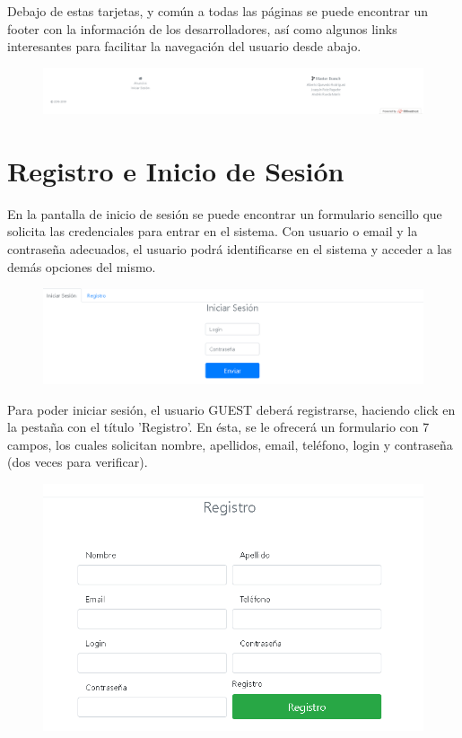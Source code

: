 Debajo de estas tarjetas, y com\'{u}n a todas las p\'{a}ginas se puede encontrar un footer con la informaci\'{o}n de los desarrolladores, as\'{i} como algunos links interesantes para facilitar la navegaci\'{o}n del usuario desde abajo.

\begin{figure}[h!]
\centering
\includegraphics[width=1\textwidth]{Img/ManualUsuario/FOOTER.png}
\end{figure}

\section{Registro e Inicio de Sesi\'{o}n}
En la pantalla de inicio de sesi\'{o}n se puede encontrar un formulario sencillo que solicita las credenciales para entrar en el sistema. Con usuario o email y la contrase\~{n}a adecuados, el usuario podr\'{a} identificarse en el sistema y acceder a las dem\'{a}s opciones del mismo.


\begin{figure}[h!]
\centering
\includegraphics[width=.7\textwidth]{Img/ManualUsuario/LOGIN.png}
\end{figure}


Para poder iniciar sesi\'{o}n, el usuario GUEST deber\'{a} registrarse, haciendo click en la pesta\~{n}a con el t\'{i}tulo 'Registro'. En \'{e}sta, se le ofrecer\'{a} un formulario con 7 campos, los cuales solicitan nombre, apellidos, email, tel\'{e}fono, login y contrase\~{n}a (dos veces para verificar).

\begin{figure}[h!]
\centering
\includegraphics[width=.5\textwidth]{Img/ManualUsuario/REGISTRO.png}
\end{figure}

